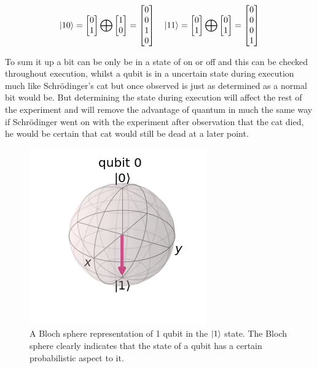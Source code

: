 \[
\ket{10}=
\begin{bmatrix}
0					\\
1
\end{bmatrix} 
\bigoplus
\begin{bmatrix}
1					\\
0
\end{bmatrix} =
\begin{bmatrix}
0					\\
0					\\
1					\\
0					\\
\end{bmatrix}
\quad
\ket{11}=
\begin{bmatrix}
0					\\
1
\end{bmatrix} 
\bigoplus
\begin{bmatrix}
0					\\
1
\end{bmatrix} =
\begin{bmatrix}
0					\\
0					\\
0					\\
1					\\
\end{bmatrix}
\]

To sum it up a bit can be only be in a state of on or off and this can be checked throughout execution, whilst a qubit is in a uncertain state during execution much like Schrödinger's cat but once observed is just as determined as a normal bit would be. But determining the state during execution will affect the rest of the experiment and will remove the advantage of quantum in much the same way if Schrödinger went on with the experiment after observation that the cat died, he would be certain that cat would still be dead at a later point.

\begin{figure}[h]
\centering
\includegraphics[scale = 0.75]{../Demonstration/img/Quantum_essentials_1.PNG}
\caption{A Bloch sphere representation of 1 qubit in the $\ket{1}$ state. 
	The Bloch sphere clearly indicates that the state of a qubit has a certain probabilistic aspect to it.}
\end{figure}

